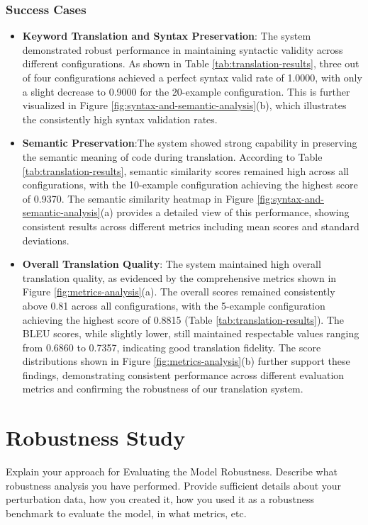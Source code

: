 \documentclass[11pt,a4paper]{article}
\begin{document}
\subsubsection{Success Cases}
\begin{itemize}[itemsep=0pt, topsep=0pt]
    \item \textbf{Keyword Translation and Syntax Preservation}: The system demonstrated robust performance in maintaining syntactic validity across different configurations. As shown in Table \ref{tab:translation-results}, three out of four configurations achieved a perfect syntax valid rate of 1.0000, with only a slight decrease to 0.9000 for the 20-example configuration. This is further visualized in Figure \ref{fig:syntax-and-semantic-analysis}(b), which illustrates the consistently high syntax validation rates.
    \item \textbf{Semantic Preservation}:The system showed strong capability in preserving the semantic meaning of code during translation. According to Table \ref{tab:translation-results}, semantic similarity scores remained high across all configurations, with the 10-example configuration achieving the highest score of 0.9370. The semantic similarity heatmap in Figure \ref{fig:syntax-and-semantic-analysis}(a) provides a detailed view of this performance, showing consistent results across different metrics including mean scores and standard deviations.
    \item \textbf{Overall Translation Quality}: The system maintained high overall translation quality, as evidenced by the comprehensive metrics shown in Figure \ref{fig:metrics-analysis}(a). The overall scores remained consistently above 0.81 across all configurations, with the 5-example configuration achieving the highest score of 0.8815 (Table \ref{tab:translation-results}). The BLEU scores, while slightly lower, still maintained respectable values ranging from 0.6860 to 0.7357, indicating good translation fidelity.
    The score distributions shown in Figure \ref{fig:metrics-analysis}(b) further support these findings, demonstrating consistent performance across different evaluation metrics and confirming the robustness of our translation system.
\end{itemize}
\section{Robustness Study}
Explain your approach for Evaluating the Model Robustness. Describe what robustness analysis you have performed. Provide sufficient details about your perturbation data, how you created it, how you used it as a robustness benchmark to evaluate the model, in what metrics, etc.
\end{document}

